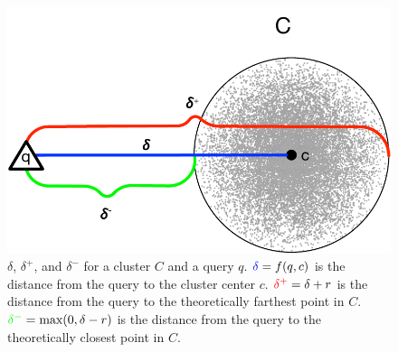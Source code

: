 \begin{figure}[H]
    \centering
    \includegraphics[scale=0.65]{images/geometry/deltas.pdf}
    \caption{
        {\color{blue}$\delta$}, {\color{red}$\delta^{+}$}, and {\color{green}$\delta^{-}$} for a cluster $C$ and a query $q$.
        ${\color{blue}\delta} = f(q, c)$ is the distance from the query to the cluster center $c$.
        ${\color{red}\delta^{+}} = \delta + r$ is the distance from the query to the theoretically farthest point in $C$.
        ${\color{green}\delta^{-}} = \text{max}(0, \delta - r)$ is the distance from the query to the theoretically closest point in $C$.
    }
    \label{fig:methods:deltas}
    \vskip -0.25in
\end{figure}

